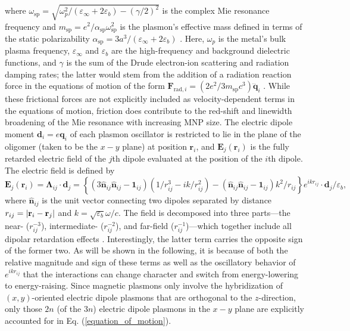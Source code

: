 \documentclass[journal=apchd5,manuscript=article]{achemso}
\begin{document}
where $\omega_{\textrm{sp}}=\sqrt{\omega_{p}^2/(\varepsilon_\infty+2\varepsilon_b)-(\gamma/2)^2}$ is the complex Mie resonance frequency and $m_{\textrm{sp}} = e^2/\alpha_{\textrm{sp}}\omega_{\textrm{sp}}^2$ is the plasmon's effective mass defined in terms of the static polarizability $\alpha_{\textrm{sp}} = 3a^3/(\varepsilon_{\infty} + 2\varepsilon_b)$ \cite{Cherqui2014}. Here, $\omega_p$ is the metal's bulk plasma frequency, $\varepsilon_{\infty}$ and $\varepsilon_b$ are the high-frequency and background dielectric functions, and $\gamma$ is the sum of the Drude electron-ion scattering and radiation damping rates; the latter would stem from the addition of a radiation reaction force in the equations of motion of the form $\textbf{F}_{\textrm{rad},i}=(2e^2/3m_{\textrm{sp}}c^3)\dddot{\textbf{q}}_i$ \cite{Draine1993}. While these frictional forces are not explicitly included as velocity-dependent terms in the equations of motion, friction does contribute to the red-shift and linewidth broadening of the Mie resonance with increasing MNP size. The electric dipole moment $\textbf{d}_i = e\textbf{q}_i$ of each plasmon oscillator is restricted to lie in the plane of the oligomer (taken to be the $x-y$ plane) at position $\textbf{r}_i$, and $\textbf{E}_j(\textbf{r}_i)$ is the fully retarded electric field of the $j$th dipole evaluated at the position of the $i$th dipole. The electric field is defined by $\textbf{E}_j(\textbf{r}_i) = \boldsymbol{\Lambda}_{ij}\cdot\textbf{d}_j= \left\{\left(3\hat{\textbf{n}}_{ij}\hat{\textbf{n}}_{ij} - \textbf{1}_{ij}\right)\left({1}/{r_{ij}^3} - {ik}/{r_{ij}^2}\right) - \left(\hat{\textbf{n}}_{ij}\hat{\textbf{n}}_{ij} - \textbf{1}_{ij}\right)k^2/r_{ij}\right\}e^{ikr_{ij}}\cdot\textbf{d}_j/\varepsilon_b,$ where $\hat{\textbf{n}}_{ij}$ is the unit vector connecting two dipoles separated by distance $r_{ij}=|{\bf r}_i-{\bf r}_j|$ and $k=\sqrt{\varepsilon_b}\omega/c.$ The field is decomposed into three parts---the near- ($r_{ij}^{-3}$), intermediate- ($r_{ij}^{-2}$), and far-field ($r_{ij}^{-1}$)---which together include all dipolar retardation effects \cite{Purcell1973}. Interestingly, the latter term carries the opposite sign of the former two. As will be shown in the following, it is because of both the relative magnitude and sign of these terms as well as the oscillatory behavior of $e^{ikr_{ij}}$ that the interactions can change character and switch from energy-lowering to energy-raising. Since magnetic plasmons only involve the hybridization of $(x,y)$-oriented electric dipole plasmons that are orthogonal to the $z$-direction, only those $2n$ (of the $3n$) electric dipole plasmons in the $x-y$ plane are explicitly accounted for in Eq. (\ref{equation_of_motion}).
\end{document}
